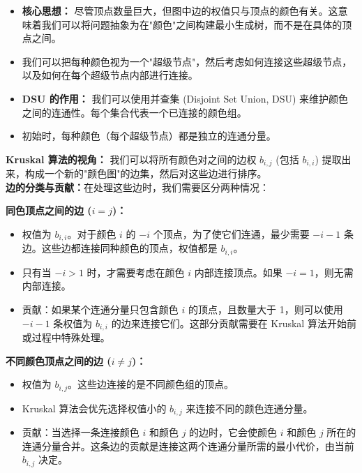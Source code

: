 \documentclass[11pt]{beamer}
\begin{document}
\begin{frame}
    \begin{itemize}
        \item \textbf{核心思想：} 尽管顶点数量巨大，但图中边的权值只与顶点的颜色有关。这意味着我们可以将问题抽象为在"颜色"之间构建最小生成树，而不是在具体的顶点之间。
        \item 我们可以把每种颜色视为一个"超级节点"，然后考虑如何连接这些超级节点，以及如何在每个超级节点内部进行连接。
        \item \textbf{DSU 的作用：} 我们可以使用并查集 (Disjoint Set Union, DSU) 来维护颜色之间的连通性。每个集合代表一个已连接的颜色组。
        \item 初始时，每种颜色（每个超级节点）都是独立的连通分量。
    \end{itemize}
\end{frame}

\begin{frame}
    \textbf{Kruskal 算法的视角：} 我们可以将所有颜色对之间的边权 $b_{i,j}$ (包括 $b_{i,i}$) 提取出来，构成一个新的"颜色图"的边集，然后对这些边进行排序。\\
    \textbf{边的分类与贡献：}在处理这些边时，我们需要区分两种情况：\\
\end{frame}

\begin{frame}
    \textbf{同色顶点之间的边 ($i=j$)：}
    \begin{itemize}
        \item 权值为 $b_{i,i}$。对于颜色 $i$ 的 $-i$ 个顶点，为了使它们连通，最少需要 $-i - 1$ 条边。这些边都连接同种颜色的顶点，权值都是 $b_{i,i}$。
        \item 只有当 $-i > 1$ 时，才需要考虑在颜色 $i$ 内部连接顶点。如果 $-i=1$，则无需内部连接。
        \item 贡献：如果某个连通分量只包含颜色 $i$ 的顶点，且数量大于 1，则可以使用 $-i - 1$ 条权值为 $b_{i,i}$ 的边来连接它们。这部分贡献需要在 Kruskal 算法开始前或过程中特殊处理。
    \end{itemize}
\end{frame}

\begin{frame}
    \textbf{不同颜色顶点之间的边 ($i \ne j$)：}
    \begin{itemize}
        \item 权值为 $b_{i,j}$。这些边连接的是不同颜色组的顶点。
        \item Kruskal 算法会优先选择权值小的 $b_{i,j}$ 来连接不同的颜色连通分量。
        \item 贡献：当选择一条连接颜色 $i$ 和颜色 $j$ 的边时，它会使颜色 $i$ 和颜色 $j$ 所在的连通分量合并。这条边的贡献是连接这两个连通分量所需的最小代价，由当前 $b_{i,j}$ 决定。
    \end{itemize}
   
\end{frame}
\end{document}
